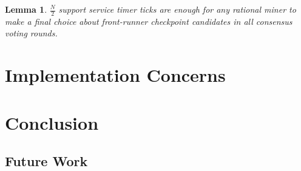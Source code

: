 \documentclass[conference]{IEEEtran}
\newtheorem{lemma}[theorem]{Lemma}
\begin{document}
\begin{lemma}
\label{l-round-time}
$\frac{N}{2}$ support service timer ticks are enough for any rational miner to make a final choice about front-runner checkpoint candidates in all consensus voting rounds.   
\end{lemma}


\section{Implementation Concerns}
\label{s-implementation}

\section{Conclusion}
\label{s-conclusion}
\subsection{Future Work}
 


\end{document}

